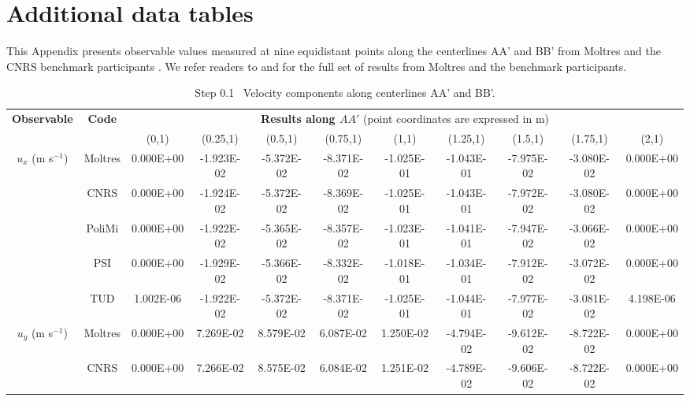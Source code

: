 \section{Additional data tables} \label{appendix:tables}

This Appendix presents observable values measured at nine
equidistant points along the centerlines AA' and BB' from Moltres and the
CNRS benchmark participants \cite{tiberga_results_2020}. We refer readers to
\cite{park_results_2021} and \cite{tiberga_results_2019} for the full set of
results from Moltres and the benchmark participants. 

\begin{table}[htbp!]
	\caption{Step 0.1 \textemdash\ Velocity components along centerlines AA' and BB'.}
	\centering
	\footnotesize
	\setlength\tabcolsep{1.5pt}
	\hspace*{-1cm}
	\renewcommand{\arraystretch}{.8}
	\begin{tabular}{c c c c c c c c c c c}
		\toprule
		\multirow{2}{*}{\textbf{Observable}} & \multirow{2}{*}{\textbf{Code}} & \multicolumn{9}{c}{\textbf{Results along $AA'$} (point coordinates are expressed in m)} \\
		& & {(0,1)} & {(0.25,1)} & {(0.5,1)} & {(0.75,1)} & {(1,1)} & {(1.25,1)} & {(1.5,1)} & {(1.75,1)} & {(2,1)} \\
		\midrule
		\multirow{5}{*}{$u_x$ (m s$^{-1}$)} & Moltres & 0.000E+00 & -1.923E-02 & -5.372E-02 & -8.371E-02 & -1.025E-01 & -1.043E-01 & -7.975E-02 & -3.080E-02 & 0.000E+00 \\
		& CNRS & 0.000E+00 & -1.924E-02 & -5.372E-02 & -8.369E-02 & -1.025E-01 & -1.043E-01 & -7.972E-02 & -3.080E-02 & 0.000E+00 \\
        & PoliMi & 0.000E+00 & -1.922E-02 & -5.365E-02 & -8.357E-02 & -1.023E-01 & -1.041E-01 & -7.947E-02 & -3.066E-02 & 0.000E+00 \\
        & PSI & 0.000E+00 & -1.929E-02 & -5.366E-02 & -8.332E-02 & -1.018E-01 & -1.034E-01 & -7.912E-02 & -3.072E-02 & 0.000E+00 \\
        & TUD & 1.002E-06 & -1.922E-02 & -5.372E-02 & -8.371E-02 & -1.025E-01 & -1.044E-01 & -7.977E-02 & -3.081E-02 & 4.198E-06 \\
        \midrule
		\multirow{5}{*}{$u_y$ (m s$^{-1}$)} & Moltres & 0.000E+00 & 7.269E-02 & 8.579E-02 & 6.087E-02 & 1.250E-02 & -4.794E-02 & -9.612E-02 & -8.722E-02 & 0.000E+00\\
		& CNRS & 0.000E+00 & 7.266E-02 & 8.575E-02 & 6.084E-02 & 1.251E-02 & -4.789E-02 & -9.606E-02 & -8.722E-02 & 0.000E+00 \\

\end{tabular}
\end{table}
